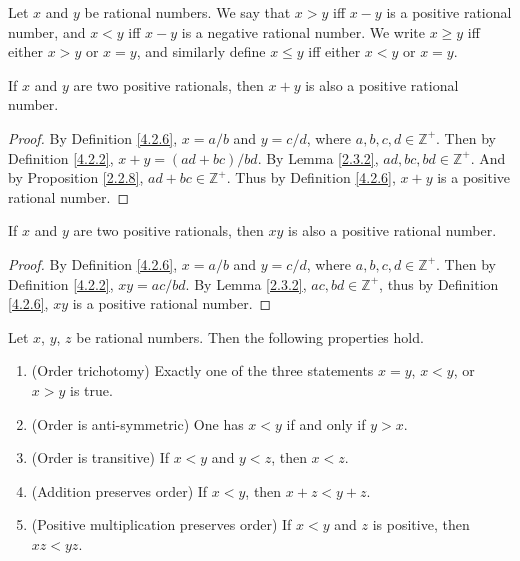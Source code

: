 \begin{definition}\label{4.2.8}
Let \(x\) and \(y\) be rational numbers.
We say that \(x > y\) iff \(x - y\) is a positive rational number, and \(x < y\) iff \(x - y\) is a negative rational number.
We write \(x \geq y\) iff either \(x > y\) or \(x = y\), and similarly define \(x \leq y\) iff either \(x < y\) or \(x = y\).
\end{definition}

\begin{additional corollary}\label{ac 4.2.4}
If \(x\) and \(y\) are two positive rationals, then \(x + y\) is also a positive rational number.
\end{additional corollary}

\begin{proof}
By Definition \ref{4.2.6}, \(x = a / b\) and \(y = c / d\), where \(a, b, c, d \in \mathds{Z}^+\).
Then by Definition \ref{4.2.2}, \(x + y = (ad + bc) / bd\).
By Lemma \ref{2.3.2}, \(ad, bc, bd \in \mathds{Z}^+\).
And by Proposition \ref{2.2.8}, \(ad + bc \in \mathds{Z}^+\).
Thus by Definition \ref{4.2.6}, \(x + y\) is a positive rational number.
\end{proof}

\begin{additional corollary}\label{ac 4.2.5}
If \(x\) and \(y\) are two positive rationals, then \(xy\) is also a positive rational number.
\end{additional corollary}

\begin{proof}
By Definition \ref{4.2.6}, \(x = a / b\) and \(y = c / d\), where \(a, b, c, d \in \mathds{Z}^+\).
Then by Definition \ref{4.2.2}, \(xy = ac / bd\).
By Lemma \ref{2.3.2}, \(ac, bd \in \mathds{Z}^+\), thus by Definition \ref{4.2.6}, \(xy\) is a positive rational number.
\end{proof}

\begin{proposition}\label{4.2.9}
Let \(x\), \(y\), \(z\) be rational numbers.
Then the following properties hold.
\begin{enumerate}
    \item (Order trichotomy)
    Exactly one of the three statements \(x = y\), \(x < y\), or \(x > y\) is true.
    \item (Order is anti-symmetric)
    One has \(x < y\) if and only if \(y > x\).
    \item (Order is transitive)
    If \(x < y\) and \(y < z\), then \(x < z\).
    \item (Addition preserves order)
    If \(x < y\), then \(x + z < y + z\).
    \item (Positive multiplication preserves order)
    If \(x < y\) and \(z\) is positive, then \(xz < yz\).
\end{enumerate}
\end{proposition}

